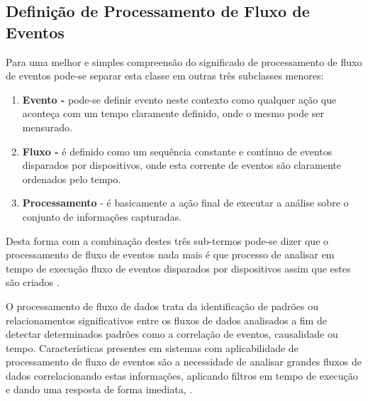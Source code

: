 \documentclass[tid,table]{texufpel} %
\begin{document}
\subsection{Definição de Processamento de Fluxo de Eventos}

Para uma melhor e simples compreensão do significado de processamento de fluxo de eventos pode-se separar esta classe em outras três subclasses menores:
\begin{enumerate}
	\item  \textbf{Evento -} pode-se definir evento neste contexto como qualquer ação que aconteça com um tempo claramente definido, onde o mesmo pode ser mensurado.  
	
	\item  \textbf{Fluxo -} é definido como um sequência constante e contínuo de eventos disparados por dispositivos, onde esta corrente de eventos são claramente ordenados pelo tempo.
	
	\item  \textbf{Processamento} - é basicamente a ação final de executar a análise sobre o conjunto de informações capturadas.
\end{enumerate}
Desta forma com a combinação destes três sub-termos pode-se dizer que o processamento de fluxo de eventos nada mais é que processo de analisar em tempo de execução fluxo de eventos disparados por dispositivos assim que estes são criados \cite{dayarathna2018recent}. 

O processamento de fluxo de dados trata da identificação de padrões ou relacionamentos significativos entre os fluxos de dados analisados a fim de detectar determinados padrões como a correlação de eventos, causalidade ou tempo.
Características presentes em sistemas com aplicabilidade de processamento de fluxo de eventos são a necessidade de analisar grandes fluxos de dados correlacionando estas informações, aplicando filtros em tempo de execução e dando uma resposta de forma imediata, \cite{appel2013event}.


\end{document}
